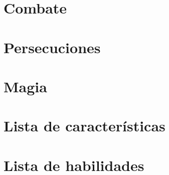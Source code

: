 \section{Combate}

\section{Persecuciones}

\section{Magia}

\section*{Lista de características}

\section*{Lista de habilidades}

